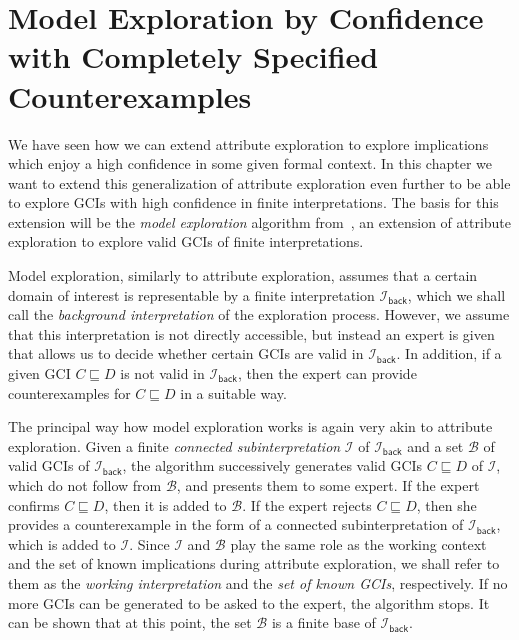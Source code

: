 \chapter[Model Exploration by Confidence]{Model Exploration by Confidence with Completely Specified Counterexamples}
\label{cha:model-expl-conf}

We have seen how we can extend attribute exploration to explore implications which enjoy a
high confidence in some given formal context.  In this chapter we want to extend this
generalization of attribute exploration even further to be able to explore GCIs with high
confidence in finite interpretations.  The basis for this extension will be the
\emph{model exploration} algorithm from~\cite{Diss-Felix}, an extension of attribute
exploration to explore valid GCIs of finite interpretations.

Model exploration, similarly to attribute exploration, assumes that a certain domain of
interest is representable by a finite interpretation $\mathcal{I}_{\mathsf{back}}$, which
we shall call the \emph{background interpretation} of the exploration process.  However,
we assume that this interpretation is not directly accessible, but instead an expert is
given that allows us to decide whether certain GCIs are valid in
$\mathcal{I}_{\mathsf{back}}$.  In addition, if a given GCI $C \sqsubseteq D$ is not valid
in $\mathcal{I}_{\mathsf{back}}$, then the expert can provide counterexamples for $C
\sqsubseteq D$ in a suitable way.

The principal way how model exploration works is again very akin to attribute exploration.
Given a finite \emph{connected subinterpretation} $\mathcal{I}$ of
$\mathcal{I}_{\mathsf{back}}$ and a set $\mathcal{B}$ of valid GCIs of
$\mathcal{I}_{\mathsf{back}}$, the algorithm successively generates valid GCIs $C
\sqsubseteq D$ of $\mathcal{I}$, which do not follow from $\mathcal{B}$, and presents them
to some expert.  If the expert confirms $C \sqsubseteq D$, then it is added to
$\mathcal{B}$.  If the expert rejects $C \sqsubseteq D$, then she provides a
counterexample in the form of a connected subinterpretation of
$\mathcal{I}_{\mathsf{back}}$, which is added to $\mathcal{I}$.  Since $\mathcal{I}$ and
$\mathcal{B}$ play the same role as the working context and the set of known implications
during attribute exploration, we shall refer to them as the \emph{working interpretation}
and the \emph{set of known GCIs}, respectively.  If no more GCIs can be generated to be
asked to the expert, the algorithm stops.  It can be shown that at this point, the set
$\mathcal{B}$ is a finite base of $\mathcal{I}_{\mathsf{back}}$.


